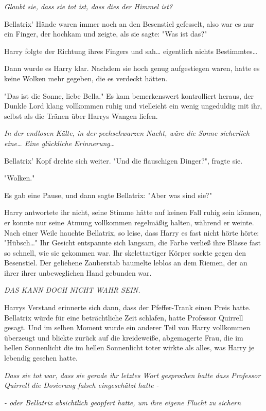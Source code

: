 {\emph{Glaubt sie, dass sie tot ist, dass dies der Himmel ist?}

Bellatrix' Hände waren immer noch an den Besenstiel gefesselt, also war es nur ein Finger, der hochkam und zeigte, als sie sagte: "Was ist das?"

Harry folgte der Richtung ihres Fingers und sah… eigentlich nichts Bestimmtes…

Dann wurde es Harry klar. Nachdem sie hoch genug aufgestiegen waren, hatte es keine Wolken mehr gegeben, die es verdeckt hätten.

"Das ist die Sonne, liebe Bella." Es kam bemerkenswert kontrolliert heraus, der Dunkle Lord klang vollkommen ruhig und vielleicht ein wenig ungeduldig mit ihr, selbst als die Tränen über Harrys Wangen liefen.

\emph{In der endlosen Kälte, in der pechschwarzen Nacht, wäre die Sonne sicherlich eine… Eine glückliche Erinnerung}…

Bellatrix' Kopf drehte sich weiter. "Und die flauschigen Dinger?", fragte sie.

"Wolken."

Es gab eine Pause, und dann sagte Bellatrix: "Aber was sind sie?"

Harry antwortete ihr nicht, seine Stimme hätte auf keinen Fall ruhig sein können, er konnte nur seine Atmung vollkommen regelmäßig halten, während er weinte. Nach einer Weile hauchte Bellatrix, so leise, dass Harry es fast nicht hörte hörte: "Hübsch…" Ihr Gesicht entspannte sich langsam, die Farbe verließ ihre Blässe fast so schnell, wie sie gekommen war. Ihr skelettartiger Körper sackte gegen den Besenstiel. Der geliehene Zauberstab baumelte leblos an dem Riemen, der an ihrer ihrer unbeweglichen Hand gebunden war.

\emph{DAS KANN DOCH NICHT WAHR SEIN.}

Harrys Verstand erinnerte sich dann, dass der Pfeffer-Trank einen Preis hatte. Bellatrix würde für eine beträchtliche Zeit schlafen, hatte Professor Quirrell gesagt. Und im selben Moment wurde ein anderer Teil von Harry vollkommen überzeugt und blickte zurück auf die kreideweiße, abgemagerte Frau, die im hellen Sonnenlicht die im hellen Sonnenlicht toter wirkte als alles, was Harry je lebendig gesehen hatte.

\emph{Dass sie tot war, dass sie gerade ihr letztes Wort gesprochen hatte dass Professor Quirrell die Dosierung falsch eingeschätzt hatte -}

\emph{- oder Bellatrix absichtlich geopfert hatte, um ihre eigene Flucht zu sichern}

}
